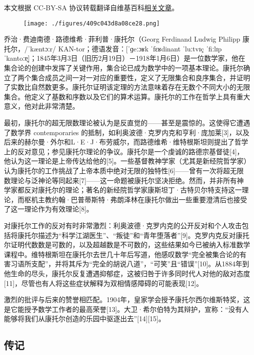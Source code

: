 
本文根据 CC-BY-SA 协议转载翻译自维基百科\href{https://en.wikipedia.org/wiki/Georg_\%E5\%BA\%B7\%E6\%89\%98\%E5\%B0\%94}{相关文章}。

\begin{figure}[ht]
\centering
\texttt{[image: ./figures/409c043d8a08ce28.png]}
\caption{} \label{fig_Canto_1}
\end{figure}
乔治·费迪南德·路德维希·菲利普·康托尔（Georg Ferdinand Ludwig Philipp 康托尔，/ˈkæntɔːr/ KAN-tor；德语发音：[ˈɡeːɔʁk ˈfɛʁdinant ˈluːtvɪç ˈfiːlɪp ˈkantoːɐ̯]；1845年3月3日（旧历2月19日）－1918年1月6日）是一位数学家，他在集合论的创建中发挥了关键作用，集合论已成为数学中的一项基本理论。康托尔确立了两个集合成员之间一对一对应的重要性，定义了无限集合和良序集合，并证明了实数比自然数更多。康托尔证明该定理的方法意味着存在无数个不同大小的无限集合。他定义了基数和序数以及它们的算术运算。康托尔的工作在哲学上具有重大意义，他对此非常清楚。

最初，康托尔的超无限数理论被认为是反直觉的——甚至是震惊的。这使得它遭遇了数学界 contemporaries 的抵制，如利奥波德·克罗内克和亨利·庞加莱[3]，以及后来的赫尔曼·外尔和L·E·J·布劳威尔，而路德维希·维特根斯坦则提出了哲学上的反对意见；参见康托尔理论的争议。康托尔是一个虔诚的路德宗基督徒[4]，他认为这一理论是上帝传达给他的[5]。一些基督教神学家（尤其是新经院哲学家）认为康托尔的工作挑战了上帝本质中绝对无限的独特性[6]——曾有一次将超无限数理论与泛神论等同起来[7]——这一命题被康托尔坚决拒绝。然而，并非所有神学家都反对康托尔的理论；著名的新经院哲学家康斯坦丁·古特贝尔特支持这一理论，而枢机主教约翰·巴普蒂斯特·弗朗泽林在康托尔做出一些重要澄清后也接受了这一理论作为有效理论[8]。

对康托尔工作的反对有时非常激烈：利奥波德·克罗内克的公开反对和个人攻击包括将康托尔描述为“科学江湖医生”、“叛徒”和“青年堕落者”[9]。克罗内克反对康托尔证明代数数是可数的，以及超越数是不可数的，这些结果如今已被纳入标准数学课程中。维特根斯坦在康托尔去世几十年后写道，他感叹数学“完全被集合论的有害习语所支配”，并将其斥为“完全的胡说八道”，“可笑”且“错误”[10]。从1884年到他生命的尽头，康托尔反复遭遇抑郁症，这被归咎于许多同时代人对他的敌对态度[11]，尽管也有人将这些症状解释为双相情感障碍的可能表现[12]。

激烈的批评与后来的赞誉相匹配。1904年，皇家学会授予康托尔西尔维斯特奖，这是它能授予数学工作者的最高荣誉[13]。大卫·希尔伯特为其辩护，宣称：“没有人能够将我们从康托尔创造的乐园中驱逐出去”[14][15]。
\subsection{传记}  
